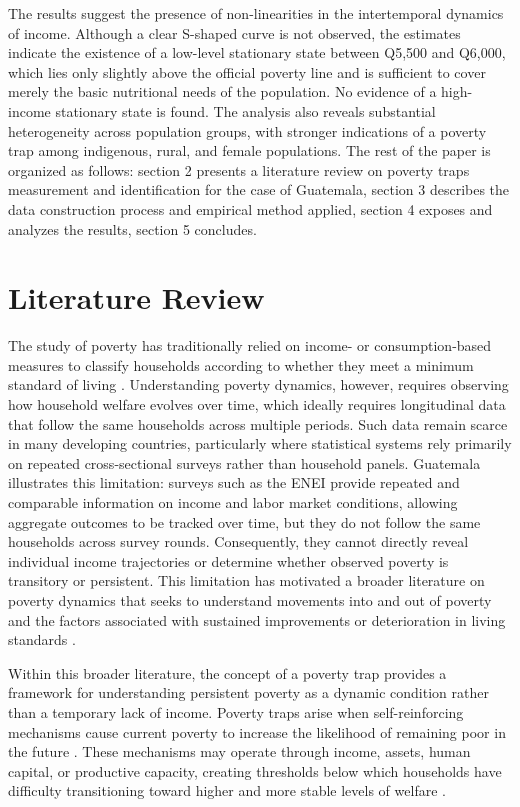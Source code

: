 \documentclass{article}
\begin{document}
The results suggest the presence of non-linearities in the intertemporal dynamics of income. Although a clear S-shaped curve is not observed, the estimates indicate the existence of a low-level stationary state between Q5,500 and Q6,000, which lies only slightly above the official poverty line and is sufficient to cover merely the basic nutritional needs of the population. No evidence of a high-income stationary state is found. The analysis also reveals substantial heterogeneity across population groups, with stronger indications of a poverty trap among indigenous, rural, and female populations. The rest of the paper is organized as follows: section 2 presents a literature review on poverty traps measurement and identification for the case of Guatemala, section 3 describes the data construction process and empirical method applied, section 4 exposes and analyzes the results, section 5 concludes. 
\section{Literature Review}

The study of poverty has traditionally relied on income- or consumption-based measures to classify households according to whether they meet a minimum standard of living \parencite{ravallion1998}. Understanding poverty dynamics, however, requires observing how household welfare evolves over time, which ideally requires longitudinal data that follow the same households across multiple periods. Such data remain scarce in many developing countries, particularly where statistical systems rely primarily on repeated cross-sectional surveys rather than household panels. Guatemala illustrates this limitation: surveys such as the ENEI provide repeated and comparable information on income and labor market conditions, allowing aggregate outcomes to be tracked over time, but they do not follow the same households across survey rounds. Consequently, they cannot directly reveal individual income trajectories or determine whether observed poverty is transitory or persistent. This limitation has motivated a broader literature on poverty dynamics that seeks to understand movements into and out of poverty and the factors associated with sustained improvements or deterioration in living standards \parencite{baulch2000}.

Within this broader literature, the concept of a poverty trap provides a framework for understanding persistent poverty as a dynamic condition rather than a temporary lack of income. Poverty traps arise when self-reinforcing mechanisms cause current poverty to increase the likelihood of remaining poor in the future \parencite{kraay2014poverty}. These mechanisms may operate through income, assets, human capital, or productive capacity, creating thresholds below which households have difficulty transitioning toward higher and more stable levels of welfare \parencite{carterbarrett2006}.
\end{document}
